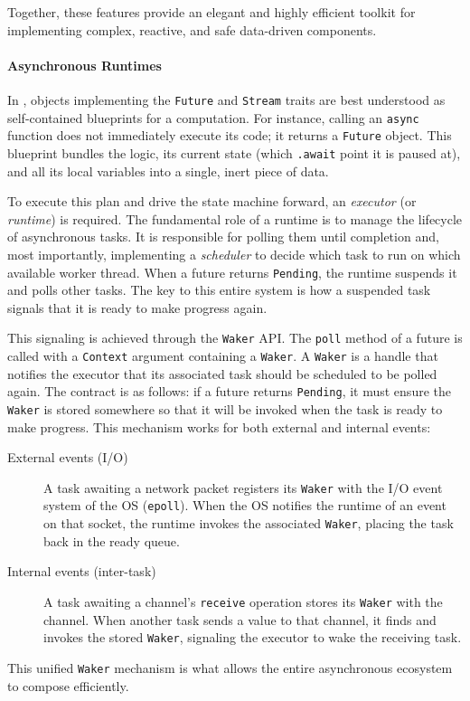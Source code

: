 Together, these features provide an elegant and highly efficient toolkit for implementing
complex, reactive, and safe data-driven components.

\paragraph{Asynchronous Runtimes}
In \Rust, objects implementing the \texttt{Future} and \texttt{Stream} traits are best understood as
self-contained blueprints for a computation. For instance, calling an \texttt{async} function does
not immediately execute its code; it returns a \texttt{Future} object. This blueprint bundles the
logic, its current state (\eg which \texttt{.await} point it is paused at), and all its local
variables into a single, inert piece of data.

To execute this plan and drive the state machine forward, an \emph{executor} (or \emph{runtime}) is
required. The fundamental role of a runtime is to manage the lifecycle of asynchronous tasks. It is
responsible for polling them until completion and, most importantly, implementing a \emph{scheduler}
to decide which task to run on which available worker thread. When a future returns \texttt{Pending},
the runtime suspends it and polls other tasks. The key to this entire system is how a suspended task
signals that it is ready to make progress again.

This signaling is achieved through the \texttt{Waker} API. The \texttt{poll} method of a future is
called with a \texttt{Context} argument containing a \texttt{Waker}. A \texttt{Waker} is a handle
that notifies the executor that its associated task should be scheduled to be polled again. The
contract is as follows: if a future returns \texttt{Pending}, it must ensure the \texttt{Waker} is
stored somewhere so that it will be invoked when the task is ready to make progress. This mechanism
works for both external and internal events:
\begin{description}
    \item[External events (I/O)] A task awaiting a network packet registers its \texttt{Waker} with
          the I/O event system of the OS (\eg \texttt{epoll}). When the OS notifies the runtime of
          an event on that socket, the runtime invokes the associated \texttt{Waker}, placing the
          task back in the ready queue.

    \item[Internal events (inter-task)] A task awaiting a channel's \texttt{receive} operation
          stores its \texttt{Waker} with the channel. When another task sends a value to that
          channel, it finds and invokes the stored \texttt{Waker}, signaling the executor to wake
          the receiving task.
\end{description}
This unified \texttt{Waker} mechanism is what allows the entire asynchronous ecosystem to compose
efficiently.

